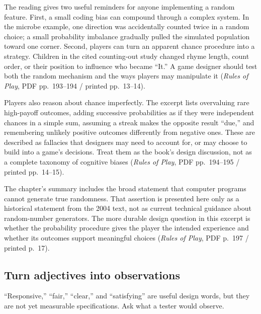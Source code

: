 The reading gives two useful reminders for anyone implementing a random feature. First, a small coding bias can compound through a complex system. In the microbe example, one direction was accidentally counted twice in a random choice; a small probability imbalance gradually pulled the simulated population toward one corner. Second, players can turn an apparent chance procedure into a strategy. Children in the cited counting-out study changed rhyme length, count order, or their position to influence who became ``It.'' A game designer should test both the random mechanism and the ways players may manipulate it (\emph{Rules of Play}, PDF pp.~193--194 / printed pp.~13--14).

Players also reason about chance imperfectly. The excerpt lists overvaluing rare high-payoff outcomes, adding successive probabilities as if they were independent chances in a simple sum, assuming a streak makes the opposite result ``due,'' and remembering unlikely positive outcomes differently from negative ones. These are described as fallacies that designers may need to account for, or may choose to build into a game's decisions. Treat them as the book's design discussion, not as a complete taxonomy of cognitive biases (\emph{Rules of Play}, PDF pp.~194--195 / printed pp.~14--15).

The chapter's summary includes the broad statement that computer programs cannot generate true randomness. That assertion is presented here only as a historical statement from the 2004 text, not as current technical guidance about random-number generators. The more durable design question in this excerpt is whether the probability procedure gives the player the intended experience and whether its outcomes support meaningful choices (\emph{Rules of Play}, PDF p.~197 / printed p.~17).

\subsection{Turn adjectives into observations}\label{05-engine-i-ch009-turn-adjectives-into-observations}

\hypertarget{05-engine-i-ch009-turn-adjectives-into-observations}{}

``Responsive,'' ``fair,'' ``clear,'' and ``satisfying'' are useful design words, but they are not yet measurable specifications. Ask what a tester would observe.

